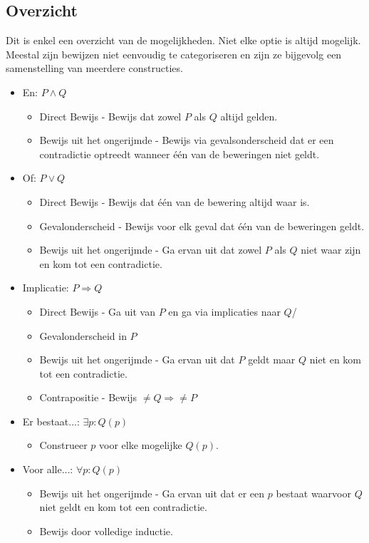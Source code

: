 \documentclass[lineaire_algebra_oplossingen.tex]{subfiles}
\begin{document}
\subsection{Overzicht}
Dit is enkel een overzicht van de mogelijkheden. Niet elke optie is altijd mogelijk. Meestal zijn bewijzen niet eenvoudig te categoriseren en zijn ze bijgevolg een samenstelling van meerdere constructies.
\begin{itemize}
\item En: $P\wedge Q$
\begin{itemize}
\item Direct Bewijs - Bewijs dat zowel $P$ als $Q$ altijd gelden.
\item Bewijs uit het ongerijmde - Bewijs via gevalsonderscheid dat er een contradictie optreedt wanneer \'e\'en van de beweringen niet geldt.
\end{itemize}
\item Of: $P\vee Q$
\begin{itemize}
\item Direct Bewijs - Bewijs dat \'e\'en van de bewering altijd waar is.
\item Gevalonderscheid - Bewijs voor elk geval dat \'e\'en van de beweringen geldt.
\item Bewijs uit het ongerijmde - Ga ervan uit dat zowel $P$ als $Q$ niet waar zijn en kom tot een contradictie.
\end{itemize}
\item Implicatie: $P\Rightarrow Q$
\begin{itemize}
\item Direct Bewijs - Ga uit van $P$ en ga via implicaties naar $Q$/
\item Gevalonderscheid in $P$
\item Bewijs uit het ongerijmde - Ga ervan uit dat $P$ geldt maar $Q$ niet en kom tot een contradictie.
\item Contrapositie - Bewijs $\neq Q\Rightarrow \neq P$
\end{itemize}
\item Er bestaat...: $\exists p : Q(p)$
\begin{itemize}
\item Construeer $p$ voor elke mogelijke $Q(p)$.
\end{itemize}
\item Voor alle...: $\forall p: Q(p)$
\begin{itemize}
\item Bewijs uit het ongerijmde - Ga ervan uit dat er een $p$ bestaat waarvoor $Q$ niet geldt en kom tot een contradictie.
\item Bewijs door volledige inductie.
\end{itemize}
\end{itemize}
\end{document}
